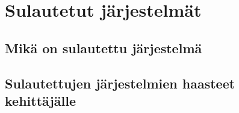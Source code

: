 \chapter{Sulautetut järjestelmät} \label{Kolmas luku}

\section{Mikä on sulautettu järjestelmä}
\section{Sulautettujen järjestelmien haasteet kehittäjälle} 